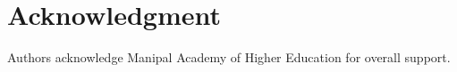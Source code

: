 \documentclass[10pt,a4paper]{article}
\begin{document}
	
	
	\section*{Acknowledgment}
	
	Authors acknowledge Manipal Academy of Higher Education for overall support.
	
	
	\footnotesize
	
	
	
	
		
		
		
		
		
		
		
		
		
		
		
\end{document}
